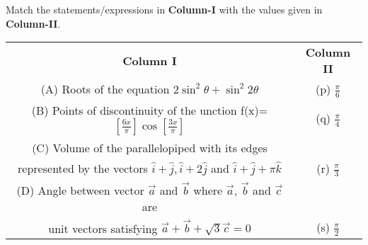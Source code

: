 \item Match the statements/expressions in \textbf{Column-I} with the values given in \textbf{Column-II}.
\begin{table}[ht!]
\centering
\begin{tabular}{c c} 
 \textbf{Column I} & \textbf{Column II}\\ [0.5ex] 
 (A) Roots of the equation
     $2\sin^{2}\theta + \sin^{2}2\theta$                    &(p) $\frac{\pi}{6}$\\ 
 (B) Points of discontinuity of the unction
     f(x)=$[\frac{6x}{\pi}]\cos[\frac{3x}{\pi}]$            &(q) $\frac{\pi}{4}$\\
 (C) Volume of the parallelopiped with its edges\\
     represented by the vectors
     $\hat{i}+\hat{j},\hat{i}+2\hat{j}$ 
     and $\hat{i}+\hat{j}+\pi\hat{k}$                       &(r) $\frac{\pi}{3}$\\
 (D) Angle between vector $\overrightarrow{a}$
     and $\overrightarrow{b}$ where $\overrightarrow{a}$, 
     $\overrightarrow{b}$ and $\overrightarrow{c}$ are\\ 
     unit vectors satisfying $\overrightarrow{a}  
     + \overrightarrow{b} + \sqrt{3}\overrightarrow{c}=0$   &(s) $\frac{\pi}{2}$\\[1ex]
                                                            
\end{tabular}
\end{table}

